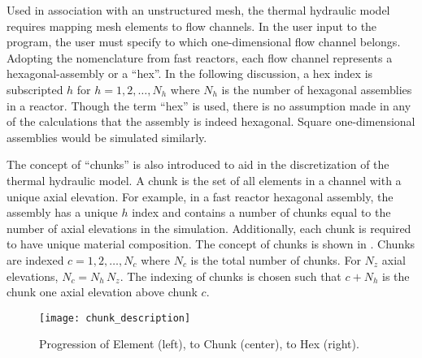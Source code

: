   Used in association with an unstructured mesh, the thermal hydraulic model
  requires mapping mesh elements to flow channels. In the user input to the
  program, the user must specify to which one-dimensional flow channel belongs.
  Adopting the nomenclature from fast reactors, each flow channel represents a
  hexagonal-assembly or a ``hex''. In the following discussion, a hex index is
  subscripted $h$ for $h = 1,2,\ldots,N_h$ where $N_h$ is the number of
  hexagonal assemblies in a reactor. Though the term ``hex'' is used, there is
  no assumption made in any of the calculations that the assembly is indeed
  hexagonal. Square one-dimensional assemblies would be simulated similarly.

  The concept of ``chunks'' is also introduced to aid in the discretization of
  the thermal hydraulic model. A chunk is the set of all elements in a channel
  with a unique axial elevation. For example, in a fast reactor hexagonal
  assembly, the assembly has a unique $h$ index and contains a number of chunks
  equal to the number of axial elevations in the simulation. Additionally, each 
  chunk is required to have unique material composition. The concept of chunks
  is shown in .  Chunks are indexed
  $c = 1,2,\ldots,N_c$ where $N_c$ is the total number of chunks. For $N_z$
  axial elevations, $N_c = N_h \, N_z$. The indexing
  of chunks is chosen such that $c+N_h$ is the chunk one axial elevation above
  chunk $c$. 

  \begin{figure}
    \centering
    \texttt{[image: chunk\_description]}
    \caption{Progression of Element (left), to Chunk (center), to Hex (right).}
    \label{fig:chunk_description}
  \end{figure}

